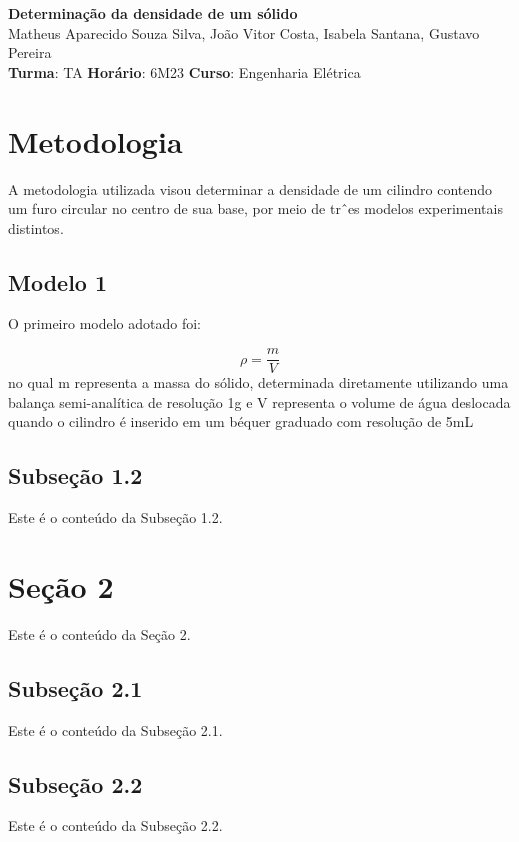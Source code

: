 \documentclass{article}
\begin{document}
\begin{center} %
    \huge %
    \textbf{Determinação da densidade de um sólido} 
    \normalsize
    \vspace{10pt}
    \\
    Matheus Aparecido Souza Silva, João Vitor Costa, Isabela Santana, Gustavo Pereira
    \\
    \vspace{5pt}
    \textbf{Turma}: TA \textbf{Horário}: 6M23  \textbf{Curso}: Engenharia Elétrica
\end{center} 

\begin{multicols*}{2} %

    \section{Metodologia}
    A metodologia utilizada visou determinar a densidade
    de um cilindro contendo um furo circular no centro de
    sua base, por meio de trˆes modelos experimentais distintos.
    \subsection{Modelo 1}
    O primeiro modelo adotado foi: 

    \begin{equation}
        \rho = \frac{m}{V}
    \end{equation} no qual {m} representa a massa do sólido, determinada diretamente utilizando uma balança semi-analítica de resolução 1g e {V} 
    representa o volume de água deslocada quando o cilindro é inserido em um béquer graduado com resolução de 5mL

    \subsection{Subseção 1.2}
    Este é o conteúdo da Subseção 1.2.
    
    \section{Seção 2}
    Este é o conteúdo da Seção 2.
    
    \subsection{Subseção 2.1}
    Este é o conteúdo da Subseção 2.1.
    
    \subsection{Subseção 2.2}
    Este é o conteúdo da Subseção 2.2.
    
    \end{multicols*} %
    
    
\end{document}
